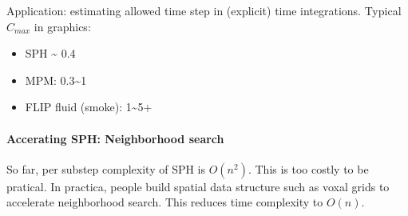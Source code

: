 \documentclass[11pt]{article}
\begin{document}
Application: estimating allowed time step in (explicit) time
integrations. Typical \(C_{max}\) in graphics:
\begin{itemize}
  \item SPH \textasciitilde{} 0.4
  \item MPM: 0.3\textasciitilde 1 
  \item FLIP fluid (smoke): 1\textasciitilde5+
\end{itemize}

\hypertarget{accerating-sph-neighborhood-search}{%
\paragraph{Accerating SPH: Neighborhood
search}\label{accerating-sph-neighborhood-search}}

So far, per substep complexity of SPH is \(O(n^{2})\). This is too
costly to be pratical. In practica, people build spatial data structure
such as voxal grids to accelerate neighborhood search. This reduces time
complexity to \(O(n)\).


    
    
    
\end{document}
